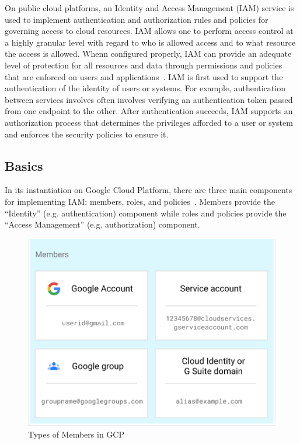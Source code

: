 On public cloud platforms, an Identity and Access Management (IAM) service is used to implement
authentication and authorization rules and policies for governing access to cloud resources.
IAM allows one to perform access control at a highly granular level with regard to who is allowed access and to what resource the access is allowed.
Whenn configured properly, IAM can provide an adequate level of protection for all resources and data through permissions and policies that are enforced on users and applications~\cite{AlmullaSameeraAbdulrahmanandYeun2010}.
IAM is first used to support the authentication of the identity of users or systems. For example, authentication between services involves often involves verifying an authentication token
passed from one endpoint to the other.  After authentication succeeds, IAM supports an
authorization process that determines the privileges afforded to a user or system and enforces
the security policies to ensure it.

\subsection{Basics}
In its instantiation on
Google Cloud Platform, there are three main components for implementing IAM: members, roles, and policies~\cite{Googlecloudiam}.  Members
provide the ``Identity'' (e.g. authentication) component while roles and policies provide the ``Access Management'' (e.g.
authorization) component.

\begin{figure}[h]
  \centering
  \includegraphics[width=\linewidth]{mem}
  \caption {Types of Members in GCP}
  \label{fig:mem}
\end{figure}

